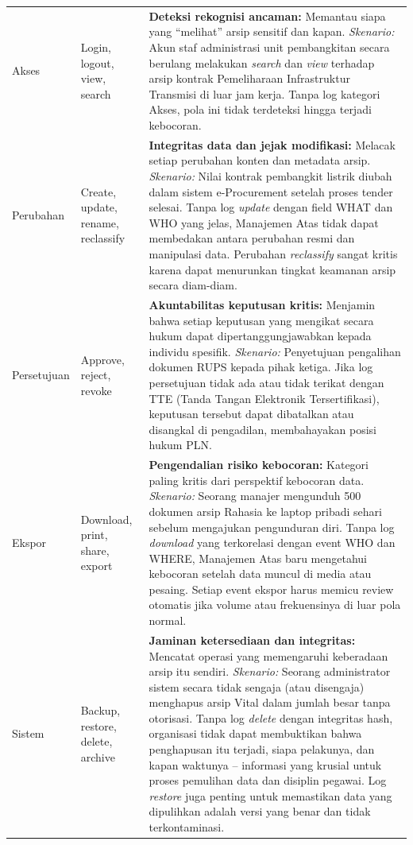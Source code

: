 \documentclass[12pt,a4paper]{report}
\begin{document}
\begin{longtable}{@{}>{\raggedright\arraybackslash}p{2.2cm} >{\raggedright\arraybackslash}p{2.8cm} >{\raggedright\arraybackslash}p{8.7cm}@{}}
Akses & Login, logout, view, search & \textbf{Deteksi rekognisi ancaman:} Memantau siapa yang ``melihat'' arsip sensitif dan kapan. \textit{Skenario:} Akun staf administrasi unit pembangkitan secara berulang melakukan \textit{search} dan \textit{view} terhadap arsip kontrak Pemeliharaan Infrastruktur Transmisi di luar jam kerja. Tanpa log kategori Akses, pola ini tidak terdeteksi hingga terjadi kebocoran. \\
\addlinespace
Perubahan & Create, update, rename, reclassify & \textbf{Integritas data dan jejak modifikasi:} Melacak setiap perubahan konten dan metadata arsip. \textit{Skenario:} Nilai kontrak pembangkit listrik diubah dalam sistem e-Procurement setelah proses tender selesai. Tanpa log \textit{update} dengan field WHAT dan WHO yang jelas, Manajemen Atas tidak dapat membedakan antara perubahan resmi dan manipulasi data. Perubahan \textit{reclassify} sangat kritis karena dapat menurunkan tingkat keamanan arsip secara diam-diam. \\
\addlinespace
Persetujuan & Approve, reject, revoke & \textbf{Akuntabilitas keputusan kritis:} Menjamin bahwa setiap keputusan yang mengikat secara hukum dapat dipertanggungjawabkan kepada individu spesifik. \textit{Skenario:} Penyetujuan pengalihan dokumen RUPS kepada pihak ketiga. Jika log persetujuan tidak ada atau tidak terikat dengan TTE (Tanda Tangan Elektronik Tersertifikasi), keputusan tersebut dapat dibatalkan atau disangkal di pengadilan, membahayakan posisi hukum PLN. \\
\addlinespace
Ekspor & Download, print, share, export & \textbf{Pengendalian risiko kebocoran:} Kategori paling kritis dari perspektif kebocoran data. \textit{Skenario:} Seorang manajer mengunduh 500 dokumen arsip Rahasia ke laptop pribadi sehari sebelum mengajukan pengunduran diri. Tanpa log \textit{download} yang terkorelasi dengan event WHO dan WHERE, Manajemen Atas baru mengetahui kebocoran setelah data muncul di media atau pesaing. Setiap event ekspor harus memicu review otomatis jika volume atau frekuensinya di luar pola normal. \\
\addlinespace
Sistem & Backup, restore, delete, archive & \textbf{Jaminan ketersediaan dan integritas:} Mencatat operasi yang memengaruhi keberadaan arsip itu sendiri. \textit{Skenario:} Seorang administrator sistem secara tidak sengaja (atau disengaja) menghapus arsip Vital dalam jumlah besar tanpa otorisasi. Tanpa log \textit{delete} dengan integritas hash, organisasi tidak dapat membuktikan bahwa penghapusan itu terjadi, siapa pelakunya, dan kapan waktunya -- informasi yang krusial untuk proses pemulihan data dan disiplin pegawai. Log \textit{restore} juga penting untuk memastikan data yang dipulihkan adalah versi yang benar dan tidak terkontaminasi. \\
\end{longtable}
\endgroup
\end{document}
